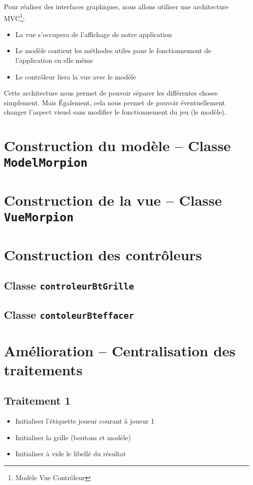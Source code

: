 \documentclass{article}
\begin{document}
	\maketitle
	Pour réaliser des interfaces graphiques, nous allons utiliser une architecture MVC\footnote{Modèle Vue Contrôleur}:
	\begin{itemize}
		\item La vue s'occupera de l'affichage de notre application
		\item Le modèle contient les méthodes utiles pour le fonctionnement de l'application en elle même
		\item Le contrôleur liera la vue avec le modèle
	\end{itemize}
	Cette architecture nous permet de pouvoir séparer les différentes choses simplement. Mais Également, cela nous permet de pouvoir éventuellement changer l'aspect visuel sans modifier le fonctionnement du jeu (le modèle).
	\section{Construction du modèle -- Classe \texttt{ModelMorpion}}
	
	\section{Construction de la vue -- Classe \texttt{VueMorpion}}
	
	\newpage
	\section{Construction des contrôleurs}
		\subsection{Classe \texttt{controleurBtGrille}}
	
		\subsection{Classe \texttt{contoleurBteffacer}}
	
	\section{Amélioration -- Centralisation des traitements}
	\subsection{Traitement 1}
	\begin{itemize}
		\item Initialiser l'étiquette joueur courant à joueur 1
		\item Initialiser la grille (boutons et modèle)
		\item Initialiser à vide le libellé du résultat
	\end{itemize}
\end{document}
